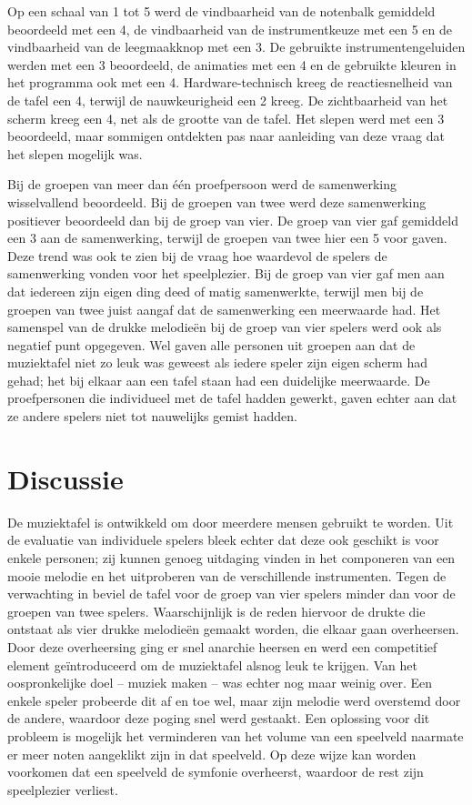 \documentclass{acm}
\begin{document}
Op een schaal van 1 tot 5 werd de vindbaarheid van de notenbalk gemiddeld beoordeeld met een 4, de vindbaarheid van de instrumentkeuze met een 5 en de vindbaarheid van de leegmaakknop met een 3. De gebruikte instrumentengeluiden werden met een 3 beoordeeld, de animaties met een 4 en de gebruikte kleuren in het programma ook met een 4. Hardware-technisch kreeg de reactiesnelheid van de tafel een 4, terwijl de nauwkeurigheid een 2 kreeg. De zichtbaarheid van het scherm kreeg een 4, net als de grootte van de tafel. Het slepen werd met een 3 beoordeeld, maar sommigen ontdekten pas naar aanleiding van deze vraag dat het slepen mogelijk was.

Bij de groepen van meer dan \'e\'en proefpersoon werd de samenwerking wisselvallend beoordeeld. Bij de groepen van twee werd deze samenwerking positiever beoordeeld dan bij de groep van vier. De groep van vier gaf gemiddeld een 3 aan de samenwerking, terwijl de groepen van twee hier een 5 voor gaven. Deze trend was ook te zien bij de vraag hoe waardevol de spelers de samenwerking vonden voor het speelplezier. Bij de groep van vier gaf men aan dat iedereen zijn eigen ding deed of matig samenwerkte, terwijl men bij de groepen van twee juist aangaf dat de samenwerking een meerwaarde had. Het samenspel van de drukke melodie\"en bij de groep van vier spelers werd ook als negatief punt opgegeven. Wel gaven alle personen uit groepen aan dat de muziektafel niet zo leuk was geweest als iedere speler zijn eigen scherm had gehad; het bij elkaar aan een tafel staan had een duidelijke meerwaarde. De proefpersonen die individueel met de tafel hadden gewerkt, gaven echter aan dat ze andere spelers niet tot nauwelijks gemist hadden.

\section{Discussie}
\label{sec_discussie}
De muziektafel is ontwikkeld om door meerdere mensen gebruikt te worden. Uit de evaluatie van individuele spelers bleek echter dat deze ook geschikt is voor enkele personen; zij kunnen genoeg uitdaging vinden in het componeren van een mooie melodie en het uitproberen van de verschillende instrumenten. Tegen de verwachting in beviel de tafel voor de groep van vier spelers minder dan voor de groepen van twee spelers. Waarschijnlijk is de reden hiervoor de drukte die ontstaat als vier drukke melodie\"en gemaakt worden, die elkaar gaan overheersen. Door deze overheersing ging er snel anarchie heersen en werd een competitief element ge\"introduceerd om de muziektafel alsnog leuk te krijgen. Van het oospronkelijke doel -- muziek maken -- was echter nog maar weinig over. Een enkele speler probeerde dit af en toe wel, maar zijn melodie werd overstemd door de andere, waardoor deze poging snel werd gestaakt. Een oplossing voor dit probleem is mogelijk het verminderen van het volume van een speelveld naarmate er meer noten aangeklikt zijn in dat speelveld. Op deze wijze kan worden voorkomen dat een speelveld de symfonie overheerst, waardoor de rest zijn speelplezier verliest.
\end{document}
